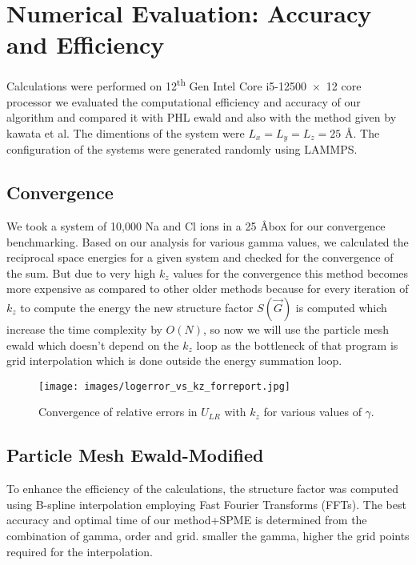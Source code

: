 \chapter{Numerical Evaluation: Accuracy and Efficiency}

\label{Chapter7} %

Calculations were performed on 12\textsuperscript{th} Gen Intel\textsuperscript{\textregistered} Core\texttrademark{} i5-12500~$\times$~12 core processor
we evaluated the computational efficiency and accuracy of our algorithm and compared it with PHL ewald and also with the method given by kawata et al.
The dimentions of the system were $L_x = L_y = L_z = 25$ \AA . The configuration of the systems were generated randomly using LAMMPS.

\section{Convergence}
We took a system of 10,000 Na and Cl ions in a 25 \AA box for our convergence benchmarking.
Based on our analysis for various gamma values, we calculated the reciprocal space energies for a given system and checked for the convergence of the sum. But due to very high $k_z$ values for the convergence this method becomes more expensive as compared to other older methods because for every iteration of $k_z$ to compute the energy the new structure factor $S(\vec G)$ is computed which increase the time complexity by $O(N)$, so now we will use the particle mesh ewald which doesn't depend on the $k_z$ loop as the bottleneck of that program is grid interpolation which is done outside the energy summation loop.
\begin{figure}[H]
    \centering
    \texttt{[image: images/logerror\_vs\_kz\_forreport.jpg]}
    \caption{Convergence of relative errors in $U_{LR}$ with $k_z$ for various values of $\gamma$.}
    \label{fig:result1}
\end{figure}
\section{Particle Mesh Ewald-Modified}
To enhance the efficiency of the calculations, the structure factor was computed using B-spline interpolation employing Fast Fourier Transforms (FFTs). The best accuracy and optimal time of our method+SPME is determined from the combination of gamma, order and grid. smaller the gamma, higher the grid points required for the interpolation. 
